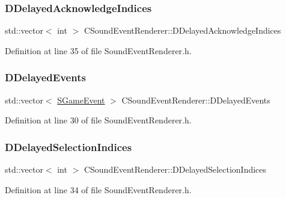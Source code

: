 \subsubsection{\texorpdfstring{D\+Delayed\+Acknowledge\+Indices}{DDelayedAcknowledgeIndices}}
{\footnotesize\ttfamily std\+::vector$<$ int $>$ C\+Sound\+Event\+Renderer\+::\+D\+Delayed\+Acknowledge\+Indices\hspace{0.3cm}{\ttfamily [protected]}}



Definition at line 35 of file Sound\+Event\+Renderer.\+h.

\hypertarget{classCSoundEventRenderer_a896d5c4717b407fdb6567aed87da3e50}{}\label{classCSoundEventRenderer_a896d5c4717b407fdb6567aed87da3e50} 
\subsubsection{\texorpdfstring{D\+Delayed\+Events}{DDelayedEvents}}
{\footnotesize\ttfamily std\+::vector$<$ \hyperlink{structSGameEvent}{S\+Game\+Event} $>$ C\+Sound\+Event\+Renderer\+::\+D\+Delayed\+Events\hspace{0.3cm}{\ttfamily [protected]}}



Definition at line 30 of file Sound\+Event\+Renderer.\+h.

\hypertarget{classCSoundEventRenderer_ab2103a634f4ba6d12824ecddf6693870}{}\label{classCSoundEventRenderer_ab2103a634f4ba6d12824ecddf6693870} 
\subsubsection{\texorpdfstring{D\+Delayed\+Selection\+Indices}{DDelayedSelectionIndices}}
{\footnotesize\ttfamily std\+::vector$<$ int $>$ C\+Sound\+Event\+Renderer\+::\+D\+Delayed\+Selection\+Indices\hspace{0.3cm}{\ttfamily [protected]}}



Definition at line 34 of file Sound\+Event\+Renderer.\+h.

